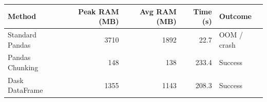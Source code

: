 \begin{tabular}{lrrrl}
\toprule
Method & Peak RAM (MB) & Avg RAM (MB) & Time (s) & Outcome \\
\midrule
Standard Pandas & 3710 & 1892 & 22.7 & OOM / crash \\
Pandas Chunking & 148 & 138 & 233.4 & Success \\
Dask DataFrame & 1355 & 1143 & 208.3 & Success \\
\bottomrule
\end{tabular}
